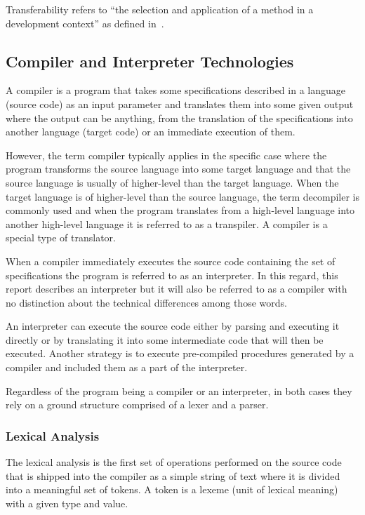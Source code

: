 Transferability refers to ``the selection and application of a method in a development context'' as defined in~\cite{Carmelo2014}.

\subsection{Compiler and Interpreter Technologies}

A compiler is a program that takes some specifications described in a language (source code) as an input parameter and translates them into some given output where the output can be anything, from the translation of the specifications into another language (target code) or an immediate execution of them.

However, the term compiler typically applies in the specific case where the program transforms the source language into some target language and that the source language is usually of higher-level than the target language. When the target language is of higher-level than the source language, the term decompiler is commonly used and when the program translates from a high-level language into another high-level language it is referred to as a transpiler. A compiler is a special type of translator.

When a compiler immediately executes the source code containing the set of specifications the program is referred to as an interpreter. In this regard, this report describes an interpreter but it will also be referred to as a compiler with no distinction about the technical differences among those words.

An interpreter can execute the source code either by parsing and executing it directly or by translating it into some intermediate code that will then be executed. Another strategy is to execute pre-compiled procedures generated by a compiler and included them as a part of the interpreter.

Regardless of the program being a compiler or an interpreter, in both cases they rely on a ground structure comprised of a lexer and a parser.

\subsubsection{Lexical Analysis}

The lexical analysis is the first set of operations performed on the source code that is shipped into the compiler as a simple string of text where it is divided into a meaningful set of tokens. A token is a lexeme (unit of lexical meaning) with a given type and value.

